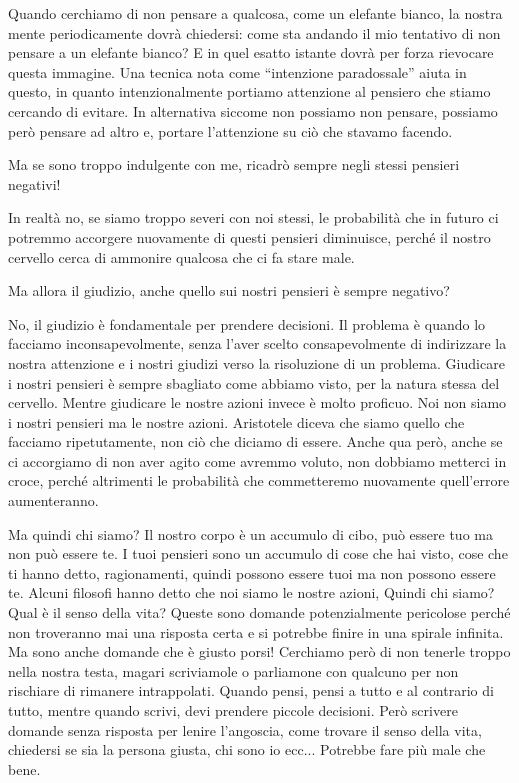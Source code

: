 \documentclass[12pt]{book} %
\begin{document}
Quando cerchiamo di non pensare a qualcosa, come un elefante bianco, la nostra mente periodicamente dovrà chiedersi:
come sta andando il mio tentativo di non pensare a un elefante bianco? E in quel esatto istante dovrà per forza
rievocare questa immagine. Una tecnica nota come “intenzione paradossale” aiuta in questo, in quanto intenzionalmente
portiamo attenzione al pensiero che stiamo cercando di evitare. In alternativa siccome non possiamo non pensare,
possiamo però pensare ad altro e, portare l'attenzione su ciò che stavamo facendo. 

Ma se sono troppo indulgente con me, ricadrò sempre negli stessi pensieri negativi! 

In realtà no, se siamo troppo severi con noi stessi, le probabilità che in futuro ci potremmo accorgere nuovamente di
questi pensieri diminuisce, perché il nostro cervello cerca di ammonire qualcosa che ci fa stare male. 

Ma allora il giudizio, anche quello sui nostri pensieri è sempre negativo?

No, il giudizio è fondamentale per prendere decisioni. Il problema è quando lo facciamo inconsapevolmente, senza
l'aver scelto consapevolmente di indirizzare la nostra attenzione e i nostri giudizi verso la
risoluzione di un problema. Giudicare i nostri pensieri è sempre sbagliato come abbiamo visto, per la natura stessa del
cervello. Mentre giudicare le nostre azioni invece è molto proficuo. Noi non siamo i nostri pensieri ma le nostre
azioni. Aristotele diceva che siamo quello che facciamo ripetutamente, non ciò che diciamo di essere. Anche qua però, anche se ci accorgiamo di non aver agito come avremmo voluto, non dobbiamo metterci in croce, perché altrimenti le probabilità che commetteremo nuovamente quell'errore aumenteranno. 

Ma quindi chi siamo? Il nostro corpo è un accumulo di cibo, può essere tuo ma non può essere te. I tuoi pensieri sono un
accumulo di cose che hai visto, cose che ti hanno detto, ragionamenti, quindi possono essere tuoi ma non possono essere
te. Alcuni filosofi hanno detto che noi siamo le nostre azioni, Quindi chi siamo? Qual è il senso della vita? Queste sono domande
potenzialmente pericolose perché non troveranno mai una risposta certa e si potrebbe finire in una spirale infinita. Ma
sono anche domande che è giusto porsi! Cerchiamo però di non tenerle troppo nella nostra testa, magari scriviamole o
parliamone con qualcuno per non rischiare di rimanere intrappolati. Quando pensi, pensi a tutto e al contrario di tutto, mentre quando scrivi, devi prendere piccole decisioni. Però scrivere domande senza risposta per lenire l'angoscia, come trovare il senso della vita, chiedersi se sia la persona giusta, chi sono io ecc... Potrebbe fare più male che bene. 
\end{document}
